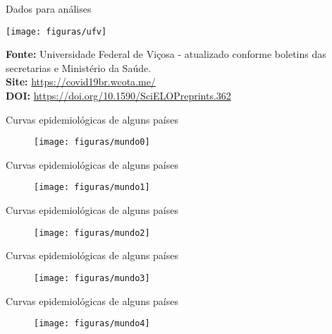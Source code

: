 \documentclass[xcolor=table,t]{beamer}
\begin{document}
\begin{frame}[c]{Dados para análises}
\hspace{-1.5 cm}\begin{minipage}[c]{3.0 cm}
	\centering
	\texttt{[image: figuras/ufv]} 
\end{minipage}
\begin{minipage}[r]{8 cm}
	\scriptsize \textbf{Fonte:} 
	 Universidade Federal de Viçosa - atualizado conforme boletins das secretarias e Ministério da Saúde.  \\
	\textbf{Site:} \href{https://covid19br.wcota.me/}{https://covid19br.wcota.me/} \\ 
	\textbf{DOI:} \href{https://doi.org/10.1590/SciELOPreprints.362}{https://doi.org/10.1590/SciELOPreprints.362} 
\end{minipage}
\end{frame}


\begin{frame}[t]{Curvas epidemiológicas de alguns países}
\vspace{-0.3 cm}
\begin{figure}
	\hspace{-0.5 cm}
	\texttt{[image: figuras/mundo0]}
\end{figure}
\end{frame}

\begin{frame}[c]{Curvas epidemiológicas de alguns países}
\vspace{-0.2 cm}
\begin{figure}
	\hspace{-0.5 cm}
	\texttt{[image: figuras/mundo1]}
\end{figure}
\end{frame}

\begin{frame}[c]{Curvas epidemiológicas de alguns países}
\begin{figure}
	\centering
	\texttt{[image: figuras/mundo2]}
\end{figure}
\end{frame}

\begin{frame}[c]{Curvas epidemiológicas de alguns países}
\begin{figure}
	\centering
	\texttt{[image: figuras/mundo3]}
\end{figure}
\end{frame}

\begin{frame}[c]{Curvas epidemiológicas de alguns países}
\begin{figure}
	\centering
	\texttt{[image: figuras/mundo4]}
\end{figure}
\end{frame}
\end{document}
